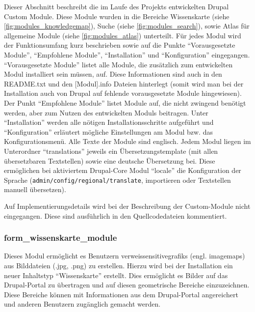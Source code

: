 Dieser Abschnitt beschreibt die im Laufe des Projekts entwickelten Drupal Custom Module. Diese Module wurden in die Bereiche Wissenskarte (siehe \cref{fig:modules_knowledgemap}), Suche (siehe \cref{fig:modules_search}), sowie Atlas für allgemeine Module (siehe \cref{fig:modules_atlas}) unterteilt.
Für jedes Modul wird der Funktionsumfang kurz beschrieben sowie auf die Punkte \enquote{Vorausgesetzte Module}, \enquote{Empfohlene Module}, \enquote{Installation} und \enquote{Konfiguration} eingegangen. \enquote{Vorausgesetzte Module} listet alle Module, die zusätzlich zum entwickelten Modul installiert sein müssen, auf. Diese Informationen sind auch in den README.txt und den [Modul].info Dateien hinterlegt (somit wird man bei der Installation auch von Drupal auf fehlende vorausgesetzte Module hingewiesen). Der Punkt \enquote{Empfohlene Module} listet Module auf, die nicht zwingend benötigt werden, aber zum Nutzen des entwickelten Moduls beitragen. Unter \enquote{Installation} werden alle nötigen Installationsschritte aufgeführt und \enquote{Konfiguration} erläutert mögliche Einstellungen am Modul bzw. das Konfigurationsmenü. Alle Texte der Module sind englisch. Jedem Modul liegen im Unterordner \enquote{translations} jeweils ein Übersetzungstemplate (mit allen übersetzbaren Textstellen) sowie eine deutsche Übersetzung bei. Diese ermöglichen bei aktiviertem Drupal-Core Modul \enquote{locale} die Konfiguration der Sprache (\lstinline|admin/config/regional/translate|, importieren oder Textstellen manuell übersetzen).

Auf Implementierungsdetails wird bei der Beschreibung der Custom-Module nicht eingegangen. Diese sind ausführlich in den Quellcodedateien kommentiert.




\subsubsection{form\_wissenskarte\_module}\label{subsub:form_wissenskarte_module}
Dieses Modul ermöglicht es Benutzern \glspl{verweissensitivegrafik} (engl. \glspl{imagemap}) aus Bilddateien (.jpg, .png) zu erstellen. Hierzu wird bei der Installation ein neuer Inhaltstyp \enquote{Wissenskarte} erstellt. Dies ermöglicht es Bilder auf das Drupal-Portal zu übertragen und auf diesen geometrische Bereiche einzuzeichnen. Diese Bereiche können mit Informationen aus dem Drupal-Portal angereichert und anderen Benutzern zugänglich gemacht werden.

